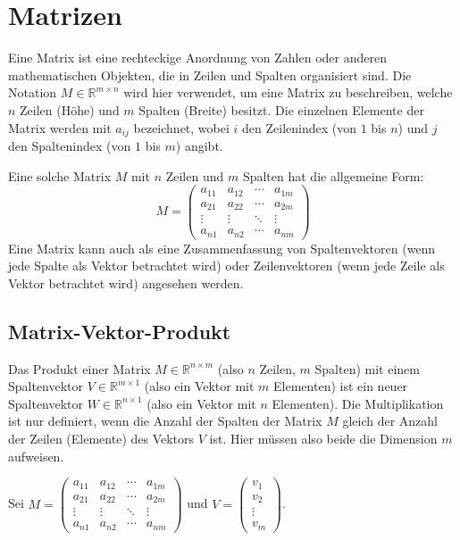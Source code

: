 \chapter{Matrizen}

Eine Matrix ist eine rechteckige Anordnung von Zahlen oder anderen
mathematischen Objekten, die in Zeilen und Spalten organisiert sind. Die
Notation $M \in \mathbb{R}^{m \times n}$ wird hier verwendet, um eine Matrix zu
beschreiben, welche $n$ Zeilen (Höhe) und $m$ Spalten (Breite) besitzt. Die
einzelnen Elemente der Matrix werden mit $a_{ij}$ bezeichnet, wobei $i$ den
Zeilenindex (von $1$ bis $n$) und $j$ den Spaltenindex (von $1$ bis $m$)
angibt.

Eine solche Matrix $M$ mit $n$ Zeilen und $m$ Spalten hat die allgemeine Form:
\[
   M = \begin{pmatrix}
      a_{11} & a_{12} & \cdots & a_{1m} \\
      a_{21} & a_{22} & \cdots & a_{2m} \\
      \vdots & \vdots & \ddots & \vdots \\
      a_{n1} & a_{n2} & \cdots & a_{nm}
   \end{pmatrix}
\]
Eine Matrix kann auch als eine Zusammenfassung von Spaltenvektoren (wenn jede
Spalte als Vektor betrachtet wird) oder Zeilenvektoren (wenn jede Zeile als
Vektor betrachtet wird) angesehen werden.

\section{Matrix-Vektor-Produkt}

Das Produkt einer Matrix $M \in \mathbb{R}^{n \times m}$ (also $n$ Zeilen, $m$
Spalten) mit einem Spaltenvektor $V \in \mathbb{R}^{m \times 1}$ (also ein
Vektor mit $m$ Elementen) ist ein neuer Spaltenvektor $W \in \mathbb{R}^{n
      \times 1}$ (also ein Vektor mit $n$ Elementen). Die Multiplikation ist nur
definiert, wenn die Anzahl der Spalten der Matrix $M$ gleich der Anzahl der
Zeilen (Elemente) des Vektors $V$ ist. Hier müssen also beide die Dimension $m$
aufweisen.

Sei $M = \begin{pmatrix}
      a_{11} & a_{12} & \cdots & a_{1m} \\
      a_{21} & a_{22} & \cdots & a_{2m} \\
      \vdots & \vdots & \ddots & \vdots \\
      a_{n1} & a_{n2} & \cdots & a_{nm}
   \end{pmatrix}$ und $V = \begin{pmatrix} v_1 \\ v_2 \\ \vdots \\ v_m \end{pmatrix}$.

